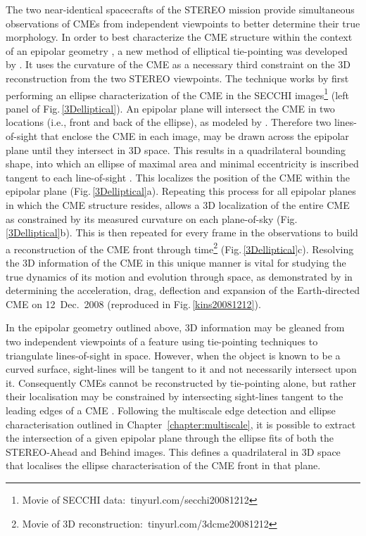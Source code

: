 \documentclass[preprint2]{aastex}
\begin{document}
The two near-identical spacecrafts of the STEREO mission provide simultaneous observations of CMEs from independent viewpoints to better determine their true morphology. In order to best characterize the CME structure within the context of an epipolar geometry \citep{2006astro.ph.12649I}, a new method of elliptical tie-pointing was developed by \citet{2010NatCo...1E..74B}. It uses the curvature of the CME as a necessary third constraint on the 3D reconstruction from the two STEREO viewpoints. The technique works by first performing an ellipse characterization of the CME in the SECCHI images\footnote{Movie of SECCHI data:~tinyurl.com/secchi20081212} (left panel of Fig.\,\ref{3Delliptical}). An epipolar plane will intersect the CME in two locations (i.e., front and back of the ellipse), as modeled by \citet{2004GeoRL..3121802P}. Therefore two lines-of-sight that enclose the CME in each image, may be drawn across the epipolar plane until they intersect in 3D space. This results in a quadrilateral bounding shape, into which an ellipse of maximal area and minimal eccentricity is inscribed tangent to each line-of-sight \citep{2005AJMAA..2.1H}. This localizes the position of the CME within the epipolar plane (Fig.\,\ref{3Delliptical}a). Repeating this process for all epipolar planes in which the CME structure resides, allows a 3D localization of the entire CME as constrained by its measured curvature on each plane-of-sky (Fig.\,\ref{3Delliptical}b). This is then repeated for every frame in the observations to build a reconstruction of the CME front through time\footnote{Movie of 3D reconstruction:~tinyurl.com/3dcme20081212} (Fig.\,\ref{3Delliptical}c). Resolving the 3D information of the CME in this unique manner is vital for studying the true dynamics of its motion and evolution through space, as demonstrated by \citet{2010NatCo...1E..74B} in determining the acceleration, drag, deflection and expansion of the Earth-directed CME on 12~Dec.~2008 (reproduced in Fig.\,\ref{kins20081212}).


In the epipolar geometry outlined above, 3D information may be gleaned from two independent viewpoints of a feature using tie-pointing techniques to triangulate lines-of-sight in space. However, when the object is known to be a curved surface, sight-lines will be tangent to it and not necessarily intersect upon it. Consequently CMEs cannot be reconstructed by tie-pointing alone, but rather their localisation may be constrained by intersecting sight-lines tangent to the leading edges of a CME \citep{2004GeoRL..3121802P, 2009SoPh..256..167D}. Following the multiscale edge detection and ellipse characterisation outlined in Chapter~\ref{chapter:multiscale}, it is possible to extract the intersection of a given epipolar plane through the ellipse fits of both the STEREO-Ahead and Behind images. This defines a quadrilateral in 3D space that localises the ellipse characterisation of the CME front in that plane.
\end{document}
